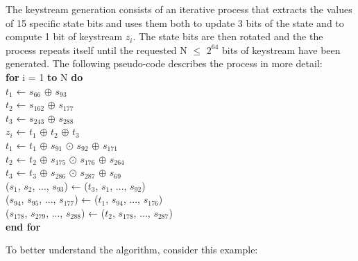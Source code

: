 \begin{enumerate}
	The keystream generation consists of an iterative process that extracts the values of 15 specific state bits and uses them both to update 3 bits of the state and to compute 1 bit of keystream $z_i$. The state bits are then rotated and the
	the process repeats itself until the requested N $\leq$ $2^{64}$ bits of keystream have been generated. The following pseudo-code describes the process in more detail:
	\vspace{0.5em}
	\\
	{\selectfont
		\textbf{for} i = 1 \textbf{to} N \textbf{do}\\
		\indent\hspace{1cm}$t_1$ ← $s_{66}$ $\oplus$ $s_{93}$\\
		\indent\hspace{1cm}$t_2$ ← $s_{162}$ $\oplus$ $s_{177}$\\
		\indent\hspace{1cm}$t_3$ ← $s_{243}$ $\oplus$ $s_{288}$\\
		\indent\hspace{1cm}$z_i$ ← $t_1$ $\oplus$ $t_2$ $\oplus$ $t_3$\\
		\indent\hspace{1cm}$t_1$ ← $t_1$ $\oplus$ $s_{91}$ $\odot$ $s_{92}$ $\oplus$ $s_{171}$\\
		\indent\hspace{1cm}$t_2$ ← $t_2$ $\oplus$ $s_{175}$ $\odot$ $s_{176}$ $\oplus$ $s_{264}$\\
		\indent\hspace{1cm}$t_3$ ← $t_3$ $\oplus$ $s_{286}$ $\odot$ $s_{287}$ $\oplus$ $s_{69}$\\
		\indent\hspace{1cm}($s_1$, $s_2$, ..., $s_{93}$) ← ($t_3$, $s_1$, ..., $s_{92}$)\\
		\indent\hspace{1cm}($s_{94}$, $s_{95}$, ..., $s_{177}$) ← ($t_1$, $s_{94}$, ..., $s_{176}$)\\
		\indent\hspace{1cm}($s_{178}$, $s_{279}$, ..., $s_{288}$) ← ($t_2$, $s_{178}$, ..., $s_{287}$)\\
		\textbf{end for}
	}
\end{enumerate}

\vspace{1cm}

To better understand the algorithm, consider this example:

